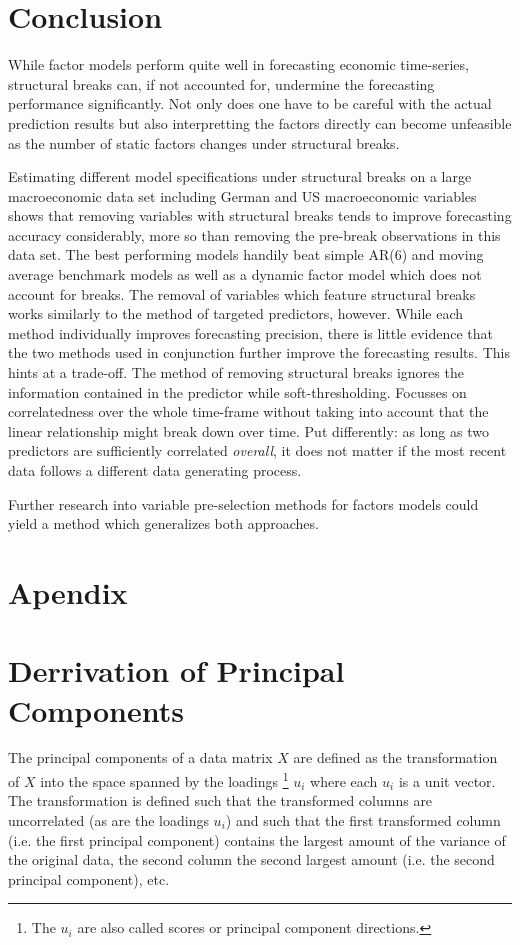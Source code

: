 \documentclass[12pt]{article}
\begin{document}
\clearpage
\section{Conclusion}
While factor models perform quite well in forecasting economic time-series, structural breaks can, if not accounted for, undermine the forecasting performance significantly. Not only does one have to be careful with the actual prediction results but also interpretting the factors directly can become unfeasible as the number of static factors changes under structural breaks.

Estimating different model specifications under structural breaks on a large macroeconomic data set including German and US macroeconomic variables shows that removing variables with structural breaks tends to improve forecasting accuracy considerably, more so than removing the pre-break observations in this data set. The best performing models handily beat simple AR(6) and moving average benchmark models as well as a dynamic factor model which does not account for breaks.
The removal of variables which feature structural breaks works similarly to the method of targeted predictors, however. While each method individually improves forecasting precision, there is little evidence that the two methods used in conjunction further improve the forecasting results. This hints at a trade-off. The method of removing structural breaks ignores the information contained in the predictor while soft-thresholding. Focusses on correlatedness over the whole time-frame without taking into account that the linear relationship might break down over time. Put differently: as long as two predictors are sufficiently correlated \textit{overall}, it does not matter if the most recent data follows a different data generating process.

Further research into variable pre-selection methods for factors models could yield a method which generalizes both approaches.



\clearpage
\newpage
\appendix
\section*{Apendix}

\section{Derrivation of Principal Components}
\label{Derrivation of Principal Components}
The principal components of a data matrix $X$ are defined as the transformation of $X$ into the space spanned by the loadings \footnote{The $u_i$ are also called scores or principal component directions.} $u_i$ where each $u_i$ is a unit vector. The transformation is defined such that the transformed columns are uncorrelated (as are the loadings $u_i$) and such that the first transformed column (i.e. the first principal component) contains the largest amount of the variance of the original data, the second column the second largest amount (i.e. the second principal component), etc. \\
\end{document}
